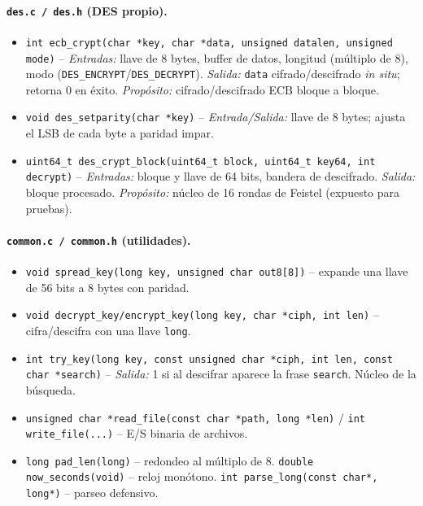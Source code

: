 \documentclass[11pt]{article}
\begin{document}
\paragraph{\texttt{des.c / des.h} (DES propio).}
\begin{itemize}
  \item \texttt{int ecb\_crypt(char *key, char *data, unsigned datalen, unsigned mode)} --
    \emph{Entradas:} llave de 8 bytes, buffer de datos, longitud (múltiplo de 8), modo
    (\texttt{DES\_ENCRYPT}/\texttt{DES\_DECRYPT}). \emph{Salida:} \texttt{data} cifrado/descifrado
    \emph{in situ}; retorna 0 en éxito. \emph{Propósito:} cifrado/descifrado ECB bloque a bloque.
  \item \texttt{void des\_setparity(char *key)} -- \emph{Entrada/Salida:} llave de 8 bytes; ajusta el
    LSB de cada byte a paridad impar.
  \item \texttt{uint64\_t des\_crypt\_block(uint64\_t block, uint64\_t key64, int decrypt)} --
    \emph{Entradas:} bloque y llave de 64 bits, bandera de descifrado. \emph{Salida:} bloque procesado.
    \emph{Propósito:} núcleo de 16 rondas de Feistel (expuesto para pruebas).
\end{itemize}

\paragraph{\texttt{common.c / common.h} (utilidades).}
\begin{itemize}
  \item \texttt{void spread\_key(long key, unsigned char out8[8])} -- expande una llave de 56 bits a 8
    bytes con paridad.
  \item \texttt{void decrypt\_key/encrypt\_key(long key, char *ciph, int len)} -- cifra/descifra con una
    llave \texttt{long}.
  \item \texttt{int try\_key(long key, const unsigned char *ciph, int len, const char *search)} --
    \emph{Salida:} 1 si al descifrar aparece la frase \texttt{search}. Núcleo de la búsqueda.
  \item \texttt{unsigned char *read\_file(const char *path, long *len)} / \texttt{int write\_file(...)}
    -- E/S binaria de archivos.
  \item \texttt{long pad\_len(long)} -- redondeo al múltiplo de 8. \quad
    \texttt{double now\_seconds(void)} -- reloj monótono. \quad
    \texttt{int parse\_long(const char*, long*)} -- parseo defensivo.
\end{itemize}
\end{document}
